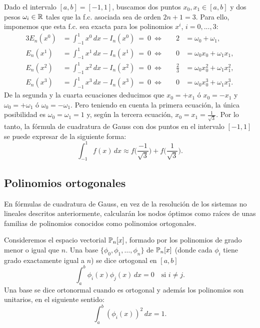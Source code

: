 \begin{example}
  Dado el intervalo $[a,b]=[-1,1]$, buscamos dos puntos $x_0,x_1\in
  [a,b]$ y dos pesos $\omega_i\in\operatorname{{\mathbb R}}$ tales que la f.c. asociada sea
  de orden $2n+1=3$. Para ello, imponemos que esta f.c. sea exacta
  para los polinomios $x^i$, $i=0,...,3$:
  \begin{alignat*}{3}
    E_n(x^0)&=\int_{-1}^1 x^0\, dx - I_n(x^0)\ =\ 0 \ \Leftrightarrow
    \quad & 2 &= \omega_0+\omega_1,\\
    E_n(x^1)&=\int_{-1}^1 x^1\, dx - I_n(x^1)\ =\ 0 \ \Leftrightarrow
    \quad & 0 &=  \omega_0x_0+\omega_1x_1,\\
    E_n(x^2)&=\int_{-1}^1 x^2\, dx - I_n(x^2)\ =\ 0 \ \Leftrightarrow
    \quad & \frac{2}{3} &= \omega_0x_0^2+\omega_1x_1^2,\\
    E_n(x^3)&=\int_{-1}^1 x^3\, dx - I_n(x^3)\ =\ 0 \ \Leftrightarrow
    \quad &0 &= 
    \omega_0x_0^3+\omega_1x_1^3.
  \end{alignat*}
  De la segunda y la cuarta ecuaciones deducimos que $x_0=+x_1$ ó
  $x_0=-x_1$ y $\omega_0=+\omega_1$ ó $\omega_0=-\omega_1$. Pero
  teniendo en cuenta la primera ecuación, la única posibilidad es
  $\omega_0=\omega_1=1$ y, según la tercera ecuación,
  $x_0=x_1=\frac{1}{\sqrt 3}$. Por lo tanto, la fórmula de cuadratura
  de Gauss con dos puntos en el intervalo $[-1,1]$ se puede expresar
  de la siguiente forma:
  \begin{equation*}
    \int_{-1}^1 f(x)\, dx \approx f\Big( \frac{-1}{\sqrt 3} \Big)
    + f\Big(\frac{1}{\sqrt 3}\Big).
  \end{equation*}
\end{example}

\subsection*{Polinomios ortogonales} 
En fórmulas de cuadratura de Gauss, en vez de la resolución de los
sistemas no lineales descritos anteriormente, calcularán los nodos
óptimos como raíces de unas familias de polinomios conocidos como
polinomios ortogonales.

\begin{definition}
  \label{def:pol-orgotonales}
  Consideremos el espacio vectorial $\operatorname{{\mathbb P}}_n[x]$, formado por los
  polinomios de grado menor o igual que $n$. Una base
  $\{\phi_0,\phi_1,\dots,\phi_n\}$ de $\operatorname{{\mathbb P}}_n[x]$ (donde cada $\phi_i$
  tiene grado exactamente igual a $n$) se dice ortogonal en
  $[a,b]$
  \begin{equation*}
    \int_a^b \phi_i(x) \phi_j(x)\, dx = 0 \quad \text{si } i\neq j.
  \end{equation*}
  Una base se dice ortonormal cuando es ortogonal y además los
  polinomios son unitarios, en el siguiente sentido:
  \begin{equation*}
    \int_a^b (\phi_i(x))^2 \,dx = 1.
  \end{equation*}
\end{definition}

